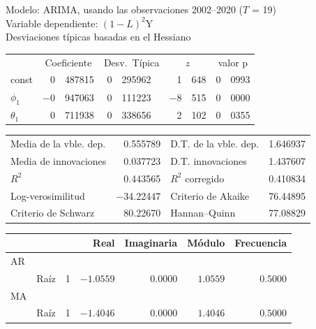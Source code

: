 \begin{center}
Modelo: ARIMA, usando las observaciones 2002--2020 ($T$ = 19)\\
Variable dependiente: $(1-L)^2$Y\\
Desviaciones típicas basadas en el Hessiano

\vspace{1em}

\begin{tabular}{lr@{.}lr@{.}lr@{.}lr@{.}l}
  &
 \multicolumn{2}{c}{Coeficiente} &
  \multicolumn{2}{c}{Desv.\ Típica} &
   \multicolumn{2}{c}{$z$} &
    \multicolumn{2}{c}{valor p} \\[1ex]
const &
  0&487815 &
    0&295962 &
      1&648 &
        0&0993 \\
$\phi_{1}$ &
  $-$0&947063 &
    0&111223 &
      $-$8&515 &
        0&0000 \\
$\theta_{1}$ &
  0&711938 &
    0&338656 &
      2&102 &
        0&0355 \\
\end{tabular}

\vspace{1ex}
\begin{tabular}{lrlr}
Media de la vble. dep. &  0.555789 & D.T. de la vble. dep. &  1.646937 \\
Media de innovaciones &  0.037723 & D.T. innovaciones &  1.437607 \\
$R^2$ &  0.443565 & $R^2$ corregido &  0.410834 \\
Log-verosimilitud & $-$34.22447 & Criterio de Akaike &  76.44895 \\
Criterio de Schwarz &  80.22670 & Hannan--Quinn &  77.08829 \\
\end{tabular}


\vspace{1em}

\begin{tabular}{llrrrrr}
& & & Real & Imaginaria & Módulo & Frecuencia \\ \hline
AR \\ 
& Raíz & 1 & $-1.0559$ & $0.0000$ & $1.0559$ & $0.5000$ \\ 
MA \\ 
& Raíz & 1 & $-1.4046$ & $0.0000$ & $1.4046$ & $0.5000$ \\ \hline
\end{tabular}

\end{center}
